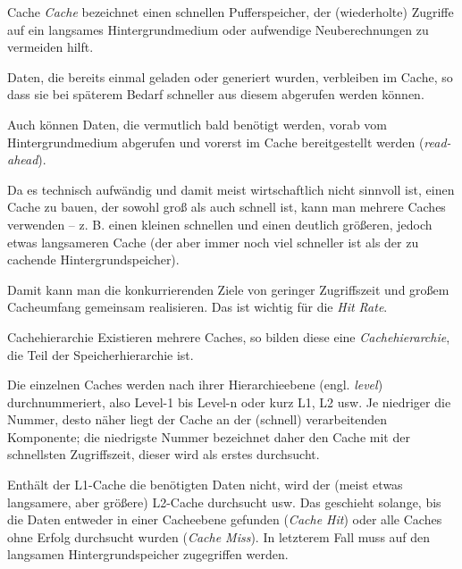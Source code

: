 \begin{defi}{Cache}
    \emph{Cache} bezeichnet einen schnellen Pufferspeicher, der (wiederholte) Zugriffe auf ein langsames Hintergrundmedium oder aufwendige Neuberechnungen zu vermeiden hilft.

    Daten, die bereits einmal geladen oder generiert wurden, verbleiben im Cache, so dass sie bei späterem Bedarf schneller aus diesem abgerufen werden können.

    Auch können Daten, die vermutlich bald benötigt werden, vorab vom Hintergrundmedium abgerufen und vorerst im Cache bereitgestellt werden (\emph{read-ahead}).

    Da es technisch aufwändig und damit meist wirtschaftlich nicht sinnvoll ist, einen Cache zu bauen, der sowohl groß als auch schnell ist, kann man mehrere Caches verwenden -- z. B. einen kleinen schnellen und einen deutlich größeren, jedoch etwas langsameren Cache (der aber immer noch viel schneller ist als der zu cachende Hintergrundspeicher).

    Damit kann man die konkurrierenden Ziele von geringer Zugriffszeit und großem Cacheumfang gemeinsam realisieren.
    Das ist wichtig für die \emph{Hit Rate}.
\end{defi}

\begin{defi}{Cachehierarchie}
    Existieren mehrere Caches, so bilden diese eine \emph{Cachehierarchie}, die Teil der Speicherhierarchie ist.

    Die einzelnen Caches werden nach ihrer Hierarchieebene (engl. \emph{level}) durchnummeriert, also Level-1 bis Level-n oder kurz L1, L2 usw.
    Je niedriger die Nummer, desto näher liegt der Cache an der (schnell) verarbeitenden Komponente;
    die niedrigste Nummer bezeichnet daher den Cache mit der schnellsten Zugriffszeit, dieser wird als erstes durchsucht.

    Enthält der L1-Cache die benötigten Daten nicht, wird der (meist etwas langsamere, aber größere) L2-Cache durchsucht usw.
    Das geschieht solange, bis die Daten entweder in einer Cacheebene gefunden (\emph{Cache Hit}) oder alle Caches ohne Erfolg durchsucht wurden (\emph{Cache Miss}).
    In letzterem Fall muss auf den langsamen Hintergrundspeicher zugegriffen werden.
\end{defi}

